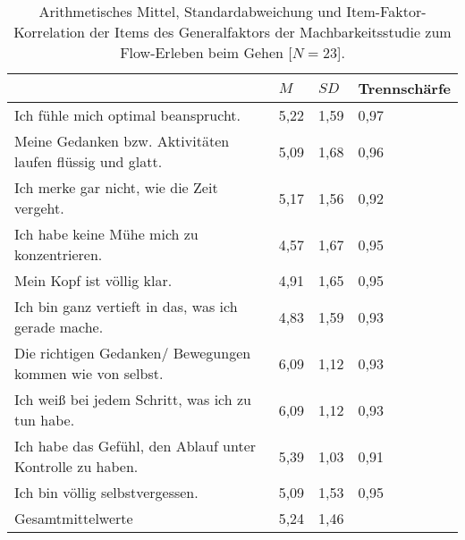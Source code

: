 \newpage
\begin{table}
	[!htb] \centering \caption[Item-Faktor-Korrelation der Items des Generalfaktors (Machbarkeitsstudie: Gehen)]{Arithmetisches Mittel, Standardabweichung und Item-Faktor-Korrelation der Items des Generalfaktors der Machbarkeitsstudie zum Flow-Erleben beim Gehen [$N = 23$].} \label{tab:generalfaktor_2} 
	\begin{tabularx}
		{ 
		\textwidth}{p{} p{} p{} p{}} \toprule & $M$ & $SD$ & Trennschärfe \\
		\midrule Ich fühle mich optimal beansprucht. & 5,22 & 1,59 & 0,97 \\
		Meine Gedanken bzw. Aktivitäten laufen flüssig und glatt. & 5,09 & 1,68 & 0,96 \\
		Ich merke gar nicht, wie die Zeit vergeht. & 5,17 & 1,56 & 0,92 \\
		Ich habe keine Mühe mich zu konzentrieren. & 4,57 & 1,67 & 0,95 \\
		Mein Kopf ist völlig klar. & 4,91 & 1,65 & 0,95 \\
		Ich bin ganz vertieft in das, was ich gerade mache. & 4,83 & 1,59 & 0,93 \\
		Die richtigen Gedanken/ Bewegungen kommen wie von selbst. & 6,09 & 1,12 & 0,93 \\
		Ich weiß bei jedem Schritt, was ich zu tun habe. & 6,09 & 1,12 & 0,93 \\
		Ich habe das Gefühl, den Ablauf unter Kontrolle zu haben. & 5,39 & 1,03 & 0,91 \\
		Ich bin völlig selbstvergessen. & 5,09 & 1,53 & 0,95 \\
		Gesamtmittelwerte & 5,24 & 1,46 & \\
		\bottomrule 
	\end{tabularx}
\end{table}
